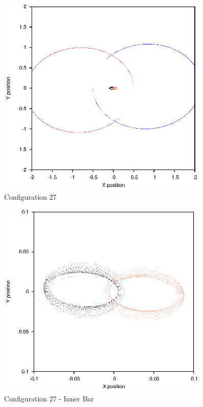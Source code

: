 \documentclass[a4paper,12pt]{article}
\begin{document}
\begin{figure}[H]
\centering
\includegraphics[width=0.9\textwidth]{./2017results/12-11-11-015/Orbit.eps}
\caption{Configuration 27}
\label{fig:config27}
\end{figure}
\begin{figure}[H]
\centering
\includegraphics[width=0.9\textwidth]{./2017results/12-11-11-015/Inner.eps}
\caption{Configuration 27 - Inner Bar}
\label{fig:config27i}
\end{figure}
\end{document}
